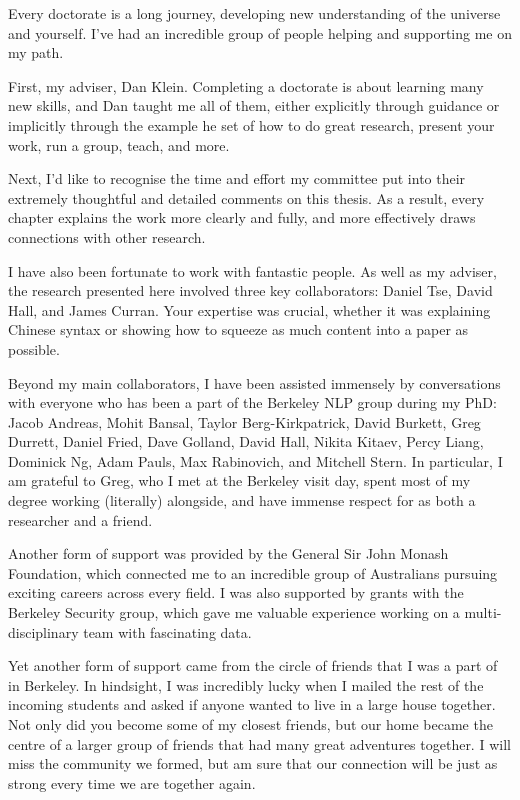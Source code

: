 \begin{acknowledgements}

Every doctorate is a long journey, developing new understanding of the universe and yourself.
I've had an incredible group of people helping and supporting me on my path.

First, my adviser, Dan Klein.
Completing a doctorate is about learning many new skills, and Dan taught me all of them, either explicitly through guidance or implicitly through the example he set of how to do great research, present your work, run a group, teach, and more.

Next, I'd like to recognise the time and effort my committee put into their extremely thoughtful and detailed comments on this thesis.
As a result, every chapter explains the work more clearly and fully, and more effectively draws connections with other research.

I have also been fortunate to work with fantastic people.
As well as my adviser, the research presented here involved three key collaborators: Daniel Tse, David Hall, and James Curran.
Your expertise was crucial, whether it was explaining Chinese syntax or showing how to squeeze as much content into a paper as possible.

Beyond my main collaborators, I have been assisted immensely by conversations with everyone who has been a part of the Berkeley NLP group during my PhD:
Jacob Andreas, Mohit Bansal, Taylor Berg-Kirkpatrick, David Burkett, Greg Durrett, Daniel Fried, Dave Golland, David Hall, Nikita Kitaev, Percy Liang, Dominick Ng, Adam Pauls, Max Rabinovich, and Mitchell Stern.
In particular, I am grateful to Greg, who I met at the Berkeley visit day, spent most of my degree working (literally) alongside, and have immense respect for as both a researcher and a friend.

Another form of support was provided by the General Sir John Monash Foundation, which connected me to an incredible group of Australians pursuing exciting careers across every field.
I was also supported by grants with the Berkeley Security group, which gave me valuable experience working on a multi-disciplinary team with fascinating data.

Yet another form of support came from the circle of friends that I was a part of in Berkeley.
In hindsight, I was incredibly lucky when I mailed the rest of the incoming students and asked if anyone wanted to live in a large house together.
Not only did you become some of my closest friends, but our home became the centre of a larger group of friends that had many great adventures together.
I will miss the community we formed, but am sure that our connection will be just as strong every time we are together again.


\end{acknowledgements}
